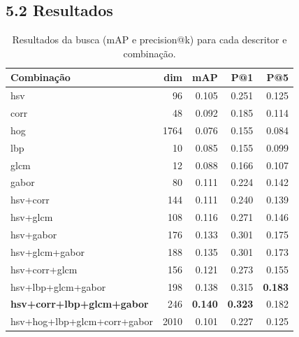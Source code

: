\documentclass[12pt, a4paper]{article}
\begin{document}
\subsection*{5.2 Resultados}
\begin{table}[H]
\centering
\begin{tabularx}{\textwidth}{X r r r r}
\toprule
\textbf{Combinação} & \textbf{dim} & \textbf{mAP} & \textbf{P@1} & \textbf{P@5} \\
\midrule
hsv                              & 96   & 0.105          & 0.251          & 0.125          \\
corr                             & 48   & 0.092          & 0.185          & 0.114          \\
hog                              & 1764 & 0.076          & 0.155          & 0.084          \\
lbp                              & 10   & 0.085          & 0.155          & 0.099          \\
glcm                             & 12   & 0.088          & 0.166          & 0.107          \\
gabor                            & 80   & 0.111          & 0.224          & 0.142          \\
hsv+corr                         & 144  & 0.111          & 0.240          & 0.139          \\
hsv+glcm                         & 108  & 0.116          & 0.271          & 0.146          \\
hsv+gabor                        & 176  & 0.133          & 0.301          & 0.175          \\
hsv+glcm+gabor                   & 188  & 0.135          & 0.301          & 0.173          \\
hsv+corr+glcm                    & 156  & 0.121          & 0.273          & 0.155          \\
hsv+lbp+glcm+gabor               & 198  & 0.138          & 0.315          & \textbf{0.183} \\
\textbf{hsv+corr+lbp+glcm+gabor} & 246  & \textbf{0.140} & \textbf{0.323} & 0.182          \\
hsv+hog+lbp+glcm+corr+gabor      & 2010 & 0.101          & 0.227          & 0.125          \\
\bottomrule
\end{tabularx}
\caption{Resultados da busca (mAP e precision@k) para cada descritor e combinação.}
\end{table}
\end{document}
